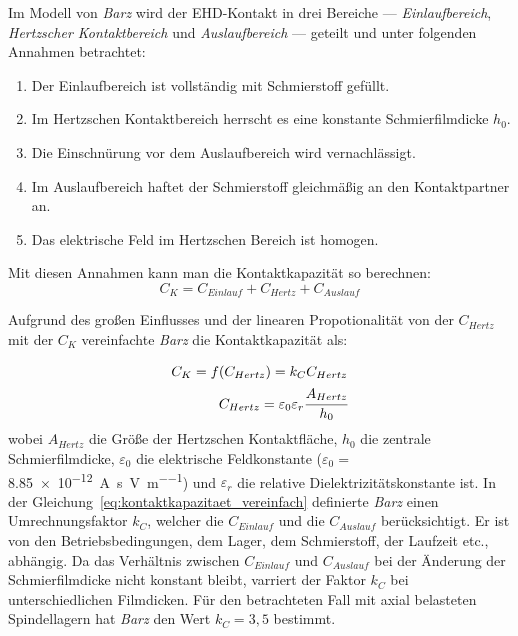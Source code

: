 Im Modell von \textit{Barz} wird der EHD-Kontakt in drei Bereiche --- \textit{Einlaufbereich}, \textit{Hertzscher Kontaktbereich} und \textit{Auslaufbereich} --- geteilt und unter folgenden Annahmen betrachtet:
\begin{enumerate}
    \item Der Einlaufbereich ist vollständig mit Schmierstoff gefüllt.
    \item Im Hertzschen Kontaktbereich herrscht es eine konstante Schmierfilmdicke $h_0$.
    \item Die Einschnürung vor dem Auslaufbereich wird vernachlässigt.
    \item Im Auslaufbereich haftet der Schmierstoff gleichmäßig an den Kontaktpartner an.
    \item Das elektrische Feld im Hertzschen Bereich ist homogen.
\end{enumerate}

Mit diesen Annahmen kann man die Kontaktkapazität so berechnen:
\begin{equation}
    C_K = C_{Einlauf} + C_{Hertz} + C_{Auslauf}
    \label{eq:kontaktkapazitaet}
\end{equation}

Aufgrund des großen Einflusses und der linearen Propotionalität von der $C_{Hertz}$ mit der $C_K$ vereinfachte \textit{Barz} die Kontaktkapazität als:

\begin{align}
    C_K = f(C_{Hertz}) = k_C C_{Hertz} \\
    C_{Hertz} = \varepsilon_0 \varepsilon_r \cfrac{A_{Hertz}}{h_0}
    \label{eq:kontaktkapazitaet_vereinfach}
\end{align}
%
wobei $A_{Hertz}$ die Größe der Hertzschen Kontaktfläche, $h_0$ die zentrale Schmierfilmdicke, $\varepsilon_0$ die elektrische Feldkonstante ($\varepsilon_0 =$ \SI[bracket-unit-denominator=false, per-mode=symbol]{8,85e-12}{\ampere\second\per\volt\per\meter}) und $\varepsilon_r$ die relative Dielektrizitätskonstante ist.
In der Gleichung~\ref{eq:kontaktkapazitaet_vereinfach} definierte \textit{Barz} einen Umrechnungsfaktor $k_C$, welcher die $C_{Einlauf}$ und die $C_{Auslauf}$ berücksichtigt.
Er ist von den Betriebsbedingungen, dem Lager, dem Schmierstoff, der Laufzeit etc., abhängig.
Da das Verhältnis zwischen $C_{Einlauf}$ und $C_{Auslauf}$ bei der Änderung der Schmierfilmdicke nicht konstant bleibt, varriert der Faktor $k_C$ bei unterschiedlichen Filmdicken.
Für den betrachteten Fall mit axial belasteten Spindellagern hat \textit{Barz} den Wert $k_C = 3,5$ bestimmt.

